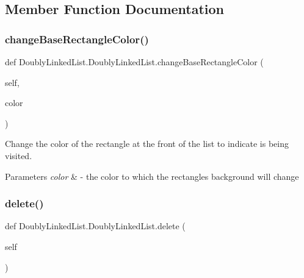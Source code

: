 \subsection{Member Function Documentation}
\mbox{\label{class_doubly_linked_list_1_1_doubly_linked_list_a9ff8f3890900f8a626ba3eb7b3d34392}} 
\subsubsection{\texorpdfstring{change\+Base\+Rectangle\+Color()}{changeBaseRectangleColor()}}
{\footnotesize\ttfamily def Doubly\+Linked\+List.\+Doubly\+Linked\+List.\+change\+Base\+Rectangle\+Color (\begin{DoxyParamCaption}\item[{}]{self,  }\item[{}]{color }\end{DoxyParamCaption})}



Change the color of the rectangle at the front of the list to indicate is being visited. 


\begin{DoxyParams}{Parameters}
{\em color} & -\/ the color to which the rectangle\textquotesingle{}s background will change \\
\hline
\end{DoxyParams}
\mbox{\label{class_doubly_linked_list_1_1_doubly_linked_list_a8fb4a60ec711acd1e0d02db18b72919c}} 
\subsubsection{\texorpdfstring{delete()}{delete()}}
{\footnotesize\ttfamily def Doubly\+Linked\+List.\+Doubly\+Linked\+List.\+delete (\begin{DoxyParamCaption}\item[{}]{self }\end{DoxyParamCaption})}



